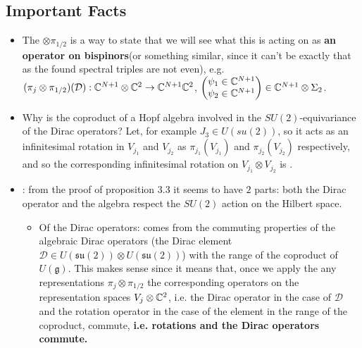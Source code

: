 \documentclass{article}
\newcommand{\alg}[1]{\ensuremath{\mathfrak{#1}}}
\newcommand{\sut}{\ensuremath{\mathfrak{su}(2)}}
\begin{document}
\subsection{Important Facts}

    \begin{itemize}

    \item The $\otimes \pi_{1/2}$ is a way to state that we will see what this is acting on as \textbf{an operator on bispinors}(or something similar, since it can't be exactly that as the found spectral triples are not even), e.g. $(\pi_j \otimes \pi_{1/2})(\mathcal D): \mathbb{C}^{N+1}\otimes \mathbb{C}^2 \to \mathbb{C}^{N+1}\mathbb{C}^2$, $\begin{pmatrix} \psi_1 \in \mathbb{C}^{N+1} \\ \psi_2 \in \mathbb{C}^{N+1} \end{pmatrix} \in \mathbb{C}^{N+1}\otimes \Sigma_2$.
    
    \item Why is the coproduct of a Hopf algebra involved in the $SU(2)$-equivariance of the Dirac operators? Let, for example $J_3 \in U(su(2))$, so it acts as an infinitesimal rotation in $V_{j_1}$ and $V_{j_2}$ as $\pi_{j_1}(V_{j_1})$ and $\pi_{j_2}(V_{j_2})$ respectively, and so the corresponding infinitesimal rotation on $V_{j_1}\otimes V_{j_2}$ is .
    
    \item {}: from the proof of proposition 3.3 it seems to have $2$ parts: both the Dirac operator and the algebra respect the $SU(2)$ action on the Hilbert space.
    
        \begin{itemize}
            
        \item Of the Dirac operators: comes from the commuting properties of the algebraic Dirac operators (the Dirac element $\mathcal D \in U(\sut) \otimes U(\sut)$) with the range of the coproduct of $U(\alg g)$. This makes sense since it means that, once we apply the any representations $\pi_j \otimes \pi_{1/2}$ the corresponding operators on the representation spaces $V_j \otimes \mathbb{C}^2$, i.e. the Dirac operator in the case of $\mathcal D$ and the rotation operator in the case of the element in the range of the coproduct, commute, \textbf{i.e. rotations and the Dirac operators commute.}
            

\end{itemize}
\end{itemize}
\end{document}
